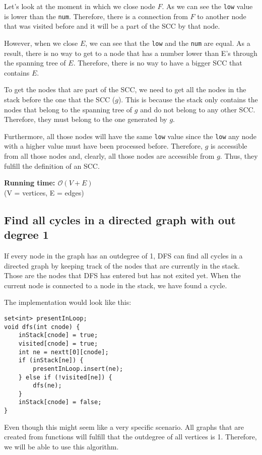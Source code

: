 Let's look  at the moment in which we close node $F$. As we can see the \texttt{low}
value is lower than the \texttt{num}. Therefore, there is a connection from $F$ to
another node that was visited before and it will be a part of the SCC 
by that node.

However, when we close $E$, we can see that the \texttt{low} and the \texttt{num}
are equal. As a result, there is no way to get to a node that has a number lower than
E's through the spanning tree of $E$. Therefore, there is no way to have a bigger 
SCC that contains $E$.

To get the nodes that are part of the SCC, we need to get all the nodes in the stack before
the one that  the SCC ($g$). This is because the stack only contains the 
nodes that belong to the spanning tree of $g$ and do not belong to any other SCC. 
Therefore, they must belong to the one generated by $g$. 

Furthermore, all those nodes will have the same \texttt{low} value since the \texttt{low}
any node with a higher value must have been processed before. Therefore, $g$ is accessible
from all those nodes and, clearly, all those nodes are accessible from $g$.
Thus, they fulfill the definition of an SCC.



\newpage
{}
\noindent \textbf{\boldmath Running time: $\mathcal{O}(V+E)$}
\\ {\small (V = vertices, E = edges)}

\subsection{Find all cycles in a directed graph with out degree 1}
If every node in the graph has an outdegree of 1, 
DFS can find all cycles in a directed graph by keeping track of the nodes that 
are currently in the stack. Those are the nodes that DFS has entered but 
has not exited yet. When the current node is connected to a node
in the stack, we have found a cycle.

The implementation would look like this:
\begin{verbatim}
set<int> presentInLoop;
void dfs(int cnode) {
    inStack[cnode] = true;
    visited[cnode] = true;
    int ne = nextt[0][cnode];
    if (inStack[ne]) {
        presentInLoop.insert(ne);
    } else if (!visited[ne]) {
        dfs(ne);
    }
    inStack[cnode] = false;
}
\end{verbatim}
Even though this might seem like a very specific scenario. All graphs that
are created from functions will fulfill that the outdegree of all vertices 
is 1. Therefore, we will be able to use this algorithm.



